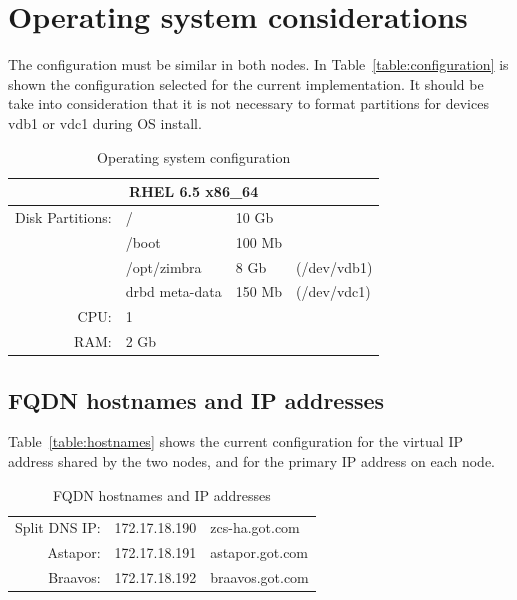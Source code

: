 \documentclass[a4paper, 12pt]{book}
\begin{document}
\section{Operating system considerations}
\label{sec:considerations}

The configuration must be similar in both nodes. In Table~\ref{table:configuration} is shown the configuration selected for the current implementation. It should be take into consideration that it is not necessary to format partitions for devices vdb1 or vdc1 during OS install.


\begin{table}
  \centering
  \begin{tabular}{ | r l l l | }
  
    \hline    
    \multicolumn{4}{|c|}{\textbf{RHEL 6.5 x86\_64}}\\
    \hline
    Disk Partitions: & /              & 10 Gb  & \\
                     & /boot          & 100 Mb & \\
                     & /opt/zimbra    & 8 Gb   & (/dev/vdb1)\\
                     & drbd meta-data & 150 Mb & (/dev/vdc1)\\
    CPU:             & 1              &        & \\
    RAM:			 & 2 Gb 		  &        & \\
    \hline
  \end{tabular}
\caption{Operating system configuration}
\label{table:os}
\end{table}


\subsection{FQDN hostnames and IP addresses}
\label{sec:fqdn}


Table~\ref{table:hostnames} shows the current configuration for the virtual IP address shared by the two nodes, and for the primary IP address on each node.\\

\begin{table}
  \centering
  \begin{tabular}{ | r c l | }
    \hline    
    Split DNS IP: & 172.17.18.190 & zcs-ha.got.com \\
	Astapor:      & 172.17.18.191 & astapor.got.com \\
	Braavos:      & 172.17.18.192 & braavos.got.com \\
    \hline
  \end{tabular}
\caption{FQDN hostnames and IP addresses}
\label{table:fqdn}
\end{table}
\end{document}
